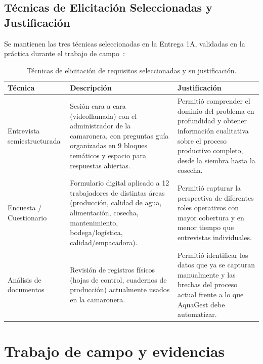 \documentclass[11pt,a4paper]{article}
\begin{document}
\subsection{Técnicas de Elicitación Seleccionadas y Justificación}
Se mantienen las tres técnicas seleccionadas en la Entrega 1A, validadas en la práctica durante el trabajo de campo~\cite{srs_ieee29148_2022}:
\begin{longtable}{|p{4cm}|p{6cm}|p{6cm}|}
\caption{Técnicas de elicitación de requisitos seleccionadas y su justificación.}
\label{tab:tecnicas-elicitacion} \\
\hline

\textbf{Técnica} & \textbf{Descripción} & \textbf{Justificación} \\
\hline
\endhead

\hline
\endfoot

\hline
\endlastfoot

Entrevista semiestructurada &
Sesión cara a cara (videollamada) con el administrador de la camaronera, con preguntas guía organizadas en 9 bloques temáticos y espacio para respuestas abiertas. &
Permitió comprender el dominio del problema en profundidad y obtener información cualitativa sobre el proceso productivo completo, desde la siembra hasta la cosecha. \\
\hline

Encuesta / Cuestionario &
Formulario digital aplicado a 12 trabajadores de distintas áreas (producción, calidad de agua, alimentación, cosecha, mantenimiento, bodega/logística, calidad/empacadora). &
Permitió capturar la perspectiva de diferentes roles operativos con mayor cobertura y en menor tiempo que entrevistas individuales. \\
\hline

Análisis de documentos &
Revisión de registros físicos (hojas de control, cuadernos de producción) actualmente usados en la camaronera. &
Permitió identificar los datos que ya se capturan manualmente y las brechas del proceso actual frente a lo que AquaGest debe automatizar. \\
\hline

\end{longtable}

\section{Trabajo de campo y evidencias}
\end{document}
